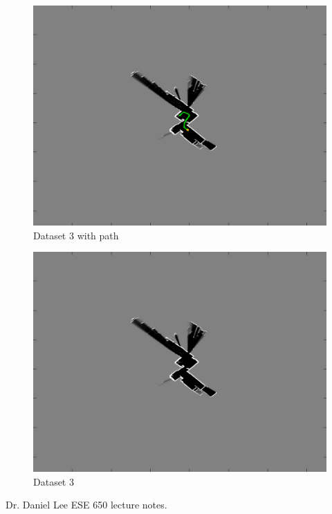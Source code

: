 \documentclass[english]{article}
\begin{document}
\begin{figure}[h]
\centering
\includegraphics[scale=0.65]{slam3_result}
\caption{Dataset 3 with path}
\end{figure}

\begin{figure}[h]
\centering
\includegraphics[scale=0.65]{slam3_result1}
\caption{Dataset 3}
\end{figure}


\begin{thebibliography}{99}
 Dr. Daniel Lee ESE 650 lecture notes. 
\end{thebibliography}
\end{document}
